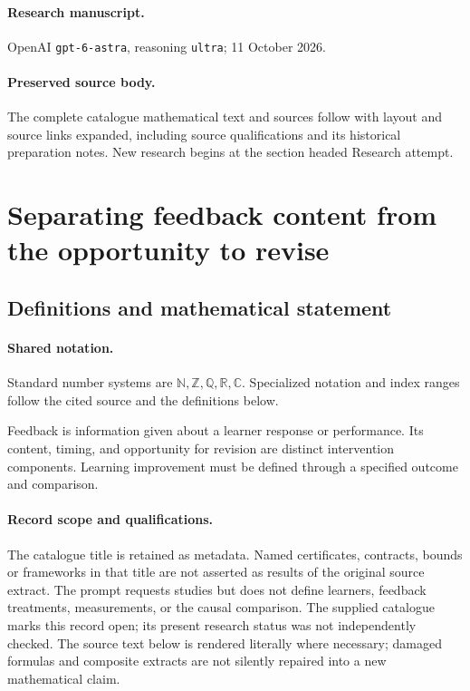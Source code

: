 \documentclass[11pt]{article}
\begin{document}
\paragraph{Research manuscript.} OpenAI \texttt{gpt-6-astra}, reasoning \texttt{ultra}; 11 October 2026.
\paragraph{Preserved source body.} The complete catalogue mathematical text and sources follow with layout and source links expanded, including source qualifications and its historical preparation notes. New research begins at the section headed Research attempt.

\section{Separating feedback content from the opportunity to revise}\label{statement}

\subsection{Definitions and mathematical statement}

\paragraph{Shared notation.}Standard number systems are $\mathbb N,\mathbb Z,\mathbb Q,\mathbb R,\mathbb C$. Specialized notation and index ranges follow the cited source and the definitions below.


Feedback is information given about a learner response or performance. Its content, timing, and opportunity for revision are distinct intervention components. Learning improvement must be defined through a specified outcome and comparison.
\paragraph{Record scope and qualifications.}
The catalogue title is retained as metadata. Named certificates, contracts, bounds or frameworks in that title are not asserted as results of the original source extract.
The prompt requests studies but does not define learners, feedback treatments, measurements, or the causal comparison. The supplied catalogue marks this record open; its present research status was not independently checked.
The source text below is rendered literally where necessary; damaged formulas and composite extracts are not silently repaired into a new mathematical claim.
\end{document}
